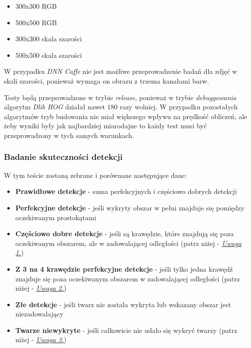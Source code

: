 \begin{itemize}
    \item 300x300 RGB
    \item 500x500 RGB
    \item 300x300 skala szarości
    \item 500x500 skala szarości
\end{itemize}

W przypadku \textit{DNN Caffe} nie jest możliwe przeprowadzenie badań dla zdjęć w skali szarości, ponieważ wymaga on obrazu z trzema kanałami barw.
\par
Testy będą przeprowadzone w trybie \textit{release}, ponieważ w trybie \textit{debuggowania} algorytm \textit{Dlib HOG} działał nawet $180$ razy wolniej. W przypadku pozostałych algorytmów tryb budowania nie miał większego wpływu na prędkość obliczeń, ale żeby wyniki były jak najbardziej miarodajne to każdy test musi być przeprowadzony w tych samych warunkach.







\subsubsection{Badanie skuteczności detekcji}

W tym teście zostaną zebrane i porównane następujące dane:
\begin{itemize}
    \item \textbf{Prawidłowe detekcje} - suma perfekcyjnych i częściowo dobrych detekcji
    \item \textbf{Perfekcyjne detekcje} - jeśli wykryty obszar w pełni znajduje się pomiędzy oczekiwanym prostokątami
    \item \textbf{Częściowo dobre detekcje} - jeśli są krawędzie, które znajdują się poza oczekiwanym obszarem, ale w zadowalającej odległości (patrz niżej - \hyperref[{uwaga:czesciowo_dobry}]{\textit{Uwaga 1.}})
    \item \textbf{Z 3 na 4 krawędzie perfekcyjne detekcje} - jeśli tylko jedna krawędź znajduje się poza oczekiwanym obszarem w zadowalającej odległości (patrz niżej - \hyperref[{uwaga:3_4_perfekcyjny}]{\textit{Uwaga 2.}})
    \item \textbf{Złe detekcje} - jeśli twarz nie została wykryta lub wskazany obszar jest niezadowalający
    \item \textbf{Twarze niewykryte} - jeśli całkowicie nie udało się wykryć twarzy (patrz niżej - \hyperref[{uwaga:dodatkowy_zle}]{\textit{Uwaga 3.}})
\end{itemize}

